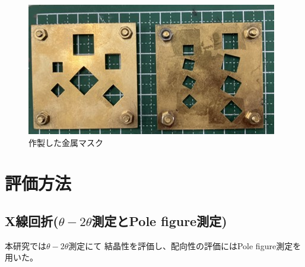 \documentclass[dvipdfmx,12pt,a4paper]{jreport}
\begin{document}
		\begin{figure}[H]
			\centering
			\includegraphics[scale=0.9]{金属マスク.jpg}
			\caption{作製した金属マスク}
			\label{金属マスク}
		\end{figure}

		\newpage
		\section{評価方法}
			\subsection{X線回折($\theta - 2\theta$測定とPole figure測定)}
			本研究では$\theta-2\theta$測定にて
			結晶性を評価し、配向性の評価にはPole figure測定を用いた。
\end{document}
